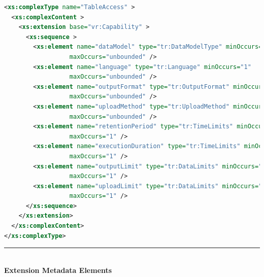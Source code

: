 \documentclass{ivoa}
\begin{document}
\begin{lstlisting}[language=XML]
<xs:complexType name="TableAccess" >
  <xs:complexContent >
    <xs:extension base="vr:Capability" >
      <xs:sequence >
        <xs:element name="dataModel" type="tr:DataModelType" minOccurs="0"
                  maxOccurs="unbounded" />
        <xs:element name="language" type="tr:Language" minOccurs="1"
                  maxOccurs="unbounded" />
        <xs:element name="outputFormat" type="tr:OutputFormat" minOccurs="1"
                  maxOccurs="unbounded" />
        <xs:element name="uploadMethod" type="tr:UploadMethod" minOccurs="0"
                  maxOccurs="unbounded" />
        <xs:element name="retentionPeriod" type="tr:TimeLimits" minOccurs="0"
                  maxOccurs="1" />
        <xs:element name="executionDuration" type="tr:TimeLimits" minOccurs="0"
                  maxOccurs="1" />
        <xs:element name="outputLimit" type="tr:DataLimits" minOccurs="0"
                  maxOccurs="1" />
        <xs:element name="uploadLimit" type="tr:DataLimits" minOccurs="0"
                  maxOccurs="1" />
      </xs:sequence>
    </xs:extension>
  </xs:complexContent>
</xs:complexType>
\end{lstlisting}

\noindent\rule[-2pt]{\textwidth}{0.5pt}\\
					\textbf{ Extension Metadata Elements}
\end{document}
